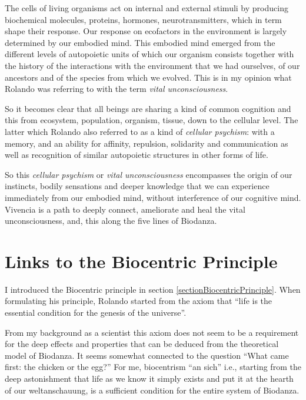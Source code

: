 \documentclass[
  11pt,
]{book}
\begin{document}
The cells of living organisms act on internal and external stimuli by producing biochemical molecules, proteins, hormones, neurotransmitters, which in term shape their response.
Our response on ecofactors in the environment is largely determined by our embodied mind. This embodied mind emerged from the different levels of autopoietic units of which our organism consists together with the history of the interactions with the environment that we had ourselves, of our ancestors and of the species from which we evolved.
This is in my opinion what Rolando was referring to with the term \emph{vital unconsciousness}.

So it becomes clear that all beings are sharing a kind of common cognition and this from ecosystem, population, organism, tissue, down to the cellular level. The latter which Rolando also referred to as a kind of \emph{cellular psychism}: with a memory, and an ability for affinity, repulsion, solidarity and communication as well as recognition of similar autopoietic structures in other forms of life.

So this \emph{cellular psychism} or \emph{vital unconsciousness} encompasses the origin of our instincts, bodily sensations and deeper knowledge that we can experience immediately from our embodied mind, without interference of our cognitive mind. Vivencia is a path to deeply connect, ameliorate and heal the vital unconsciousness, and, this along the five lines of Biodanza.

\hypertarget{links-to-the-biocentric-principle}{%
\section{Links to the Biocentric Principle}\label{links-to-the-biocentric-principle}}

I introduced the Biocentric principle in section \ref{sectionBiocentricPrinciple}. When formulating his principle, Rolando started from the axiom that ``life is the essential condition for the genesis of the universe''.

From my background as a scientist this axiom does not seem to be a requirement for the deep effects and properties that can be deduced from the theoretical model of Biodanza. It seems somewhat connected to the question ``What came first: the chicken or the egg?'' For me, biocentrism ``an sich'' i.e., starting from the deep astonishment that life as we know it simply exists and put it at the hearth of our weltanschauung, is a sufficient condition for the entire system of Biodanza.
\end{document}

